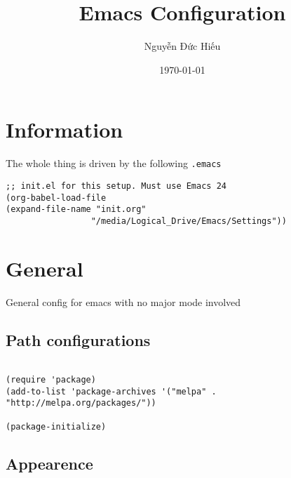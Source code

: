 \documentclass[11pt]{article}
\author{Nguyễn Đức Hiếu}
\date{\today}
\title{Emacs Configuration}
\begin{document}
\maketitle

\section{Information}
\label{sec:org3f50529}

The whole thing is driven by the following \texttt{.emacs}

\begin{verbatim}
;; init.el for this setup. Must use Emacs 24
(org-babel-load-file
(expand-file-name "init.org"
                 "/media/Logical_Drive/Emacs/Settings"))
\end{verbatim}

\section{General}
\label{sec:org765618b}
General config for emacs with no major mode involved
\subsection{Path configurations}
\label{sec:orga59c073}

\begin{verbatim}

(require 'package)
(add-to-list 'package-archives '("melpa" . "http://melpa.org/packages/"))

(package-initialize)

\end{verbatim}

\subsection{Appearence}
\label{sec:org14fbb3c}
\end{document}

